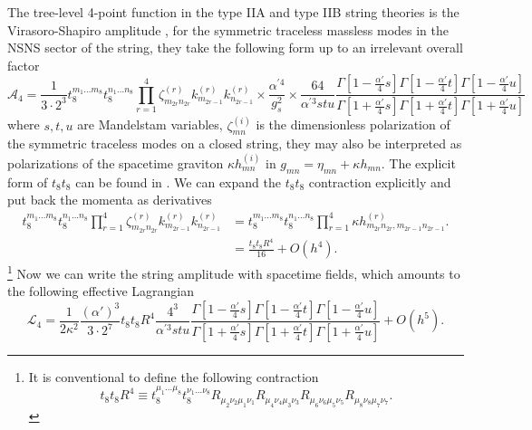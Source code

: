 The tree-level 4-point function in the type IIA and type IIB string theories is the Virasoro-Shapiro amplitude \cite{Green:2012oqa}, for the symmetric traceless massless modes in the NSNS sector of the string, they take the following form \cite{Green:1999pv} up to an irrelevant overall factor
\begin{equation}
\mathcal A_4
=\frac{1}{3\cdot 2^3}t_8^{m_1...m_8}t_8^{n_1...n_8}               
\prod_{r=1}^4\zeta^{(r)}_{m_{2r}n_{2r}}k^{(r)}_{m_{2r-1}}k^{(r)}_{n_{2r-1}}
\times \frac{\alpha^{\prime 4}}{g_s^2}
\times\frac{64}{\alpha^{\prime 3}stu}
\frac{\Gamma[1-\tfrac{\alpha'}{4}s]\Gamma[1-\tfrac{\alpha'}{4}t]\Gamma[1-\tfrac{\alpha'}{4}u]}{\Gamma[1+\tfrac{\alpha'}{4}s]\Gamma[1+\tfrac{\alpha'}{4}t]\Gamma[1+\tfrac{\alpha'}{4}u]}
\end{equation}
where $s,t,u$ are Mandelstam variables, $\zeta^{(i)}_{mn}$ is the dimensionless polarization of the symmetric traceless modes on a closed string, they may also be interpreted as polarizations of the spacetime graviton $\kappa h^{(i)}_{mn}$ in $g_{mn}=\eta_{mn} + \kappa h_{mn}$. 
The explicit form of $t_8 t_8$ can be found in \cite{Schwarz:1982jn,Policastro:2008hg,Liu:2025uqu}.
We can expand the $t_8t_8$ contraction explicitly and put back the momenta as derivatives
\begin{equation}
\begin{aligned}
t_8^{m_1...m_8}t_8^{n_1...n_8}
\prod_{r=1}^4\zeta^{(r)}_{m_{2r}n_{2r}}k^{(r)}_{m_{2r-1}}k^{(r)}_{n_{2r-1}}
&=t_8^{m_1...m_8}t_8^{n_1...n_8}
\prod_{r=1}^4 \kappa h^{(r)}_{m_{2r}n_{2r},m_{2r-1} n_{2r-1}}.\\
&= \frac{t_8t_8 R^4}{16} + O(h^4).
\end{aligned}
\end{equation}
\footnote{
It is conventional to define the following contraction
\begin{equation}
t_8t_8 R^4\equiv
t_8^{\mu_1...\mu_8}t_8^{\nu_1...\nu_8}
R_{\mu_2\nu_2\mu_1\nu_1}
R_{\mu_4\nu_4\mu_3\nu_3}
R_{\mu_6\nu_6\mu_5\nu_5}
R_{\mu_8\nu_8\mu_7\nu_7}.
\end{equation}
}
Now we can write the string amplitude with spacetime fields, which amounts to the following effective Lagrangian
\begin{equation}
\mathcal L_4 =
\frac{1}{2\kappa^2}\frac{(\alpha')^3}{3\cdot 2^7}t_8t_8 R^4\frac{4^3}{\alpha^{\prime 3}stu}
\frac{\Gamma[1-\tfrac{\alpha'}{4}s]\Gamma[1-\tfrac{\alpha'}{4}t]\Gamma[1-\tfrac{\alpha\prime}{4}u]}{\Gamma[1+\tfrac{\alpha'}{4}s]\Gamma[1+\tfrac{\alpha'}{4}t]\Gamma[1+\tfrac{\alpha'}{4}u]}
+O(h^5).
\end{equation}
